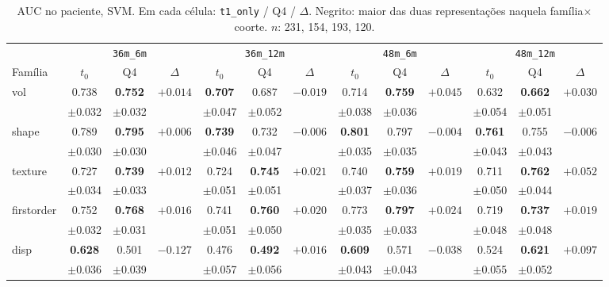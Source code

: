 \documentclass[review]{elsarticle}
\newcommand{\code}[1]{\texttt{#1}}
\begin{document}
\begin{table}
\centering
\footnotesize
\setlength{\tabcolsep}{3.5pt}
\caption{AUC no paciente, SVM.
Em cada célula: \code{t1\_only} / Q4 / $\Delta$.
Negrito: maior das duas representações naquela família$\times$coorte.
$n$: 231, 154, 193, 120.}
\label{tab:uni_4}
\begin{tabular}{@{}l ccc ccc ccc ccc@{}}
\toprule
& \multicolumn{3}{c}{\code{36m\_6m}} & \multicolumn{3}{c}{\code{36m\_12m}} & \multicolumn{3}{c}{\code{48m\_6m}} & \multicolumn{3}{c}{\code{48m\_12m}} \\
\cmidrule(lr){2-4}\cmidrule(lr){5-7}\cmidrule(lr){8-10}\cmidrule(lr){11-13}
Família & $t_0$ & Q4 & $\Delta$ & $t_0$ & Q4 & $\Delta$ & $t_0$ & Q4 & $\Delta$ & $t_0$ & Q4 & $\Delta$ \\
\midrule
vol & 0.738 & \textbf{0.752} & $+0.014$ & \textbf{0.707} & 0.687 & $-0.019$ & 0.714 & \textbf{0.759} & $+0.045$ & 0.632 & \textbf{0.662} & $+0.030$ \\
& $\pm$0.032 & $\pm$0.032 & & $\pm$0.047 & $\pm$0.052 & & $\pm$0.038 & $\pm$0.036 & & $\pm$0.054 & $\pm$0.051 & \\
shape & 0.789 & \textbf{0.795} & $+0.006$ & \textbf{0.739} & 0.732 & $-0.006$ & \textbf{0.801} & 0.797 & $-0.004$ & \textbf{0.761} & 0.755 & $-0.006$ \\
& $\pm$0.030 & $\pm$0.030 & & $\pm$0.046 & $\pm$0.047 & & $\pm$0.035 & $\pm$0.035 & & $\pm$0.043 & $\pm$0.043 & \\
texture & 0.727 & \textbf{0.739} & $+0.012$ & 0.724 & \textbf{0.745} & $+0.021$ & 0.740 & \textbf{0.759} & $+0.019$ & 0.711 & \textbf{0.762} & $+0.052$ \\
& $\pm$0.034 & $\pm$0.033 & & $\pm$0.051 & $\pm$0.051 & & $\pm$0.037 & $\pm$0.036 & & $\pm$0.050 & $\pm$0.044 & \\
firstorder & 0.752 & \textbf{0.768} & $+0.016$ & 0.741 & \textbf{0.760} & $+0.020$ & 0.773 & \textbf{0.797} & $+0.024$ & 0.719 & \textbf{0.737} & $+0.019$ \\
& $\pm$0.032 & $\pm$0.031 & & $\pm$0.051 & $\pm$0.050 & & $\pm$0.035 & $\pm$0.033 & & $\pm$0.048 & $\pm$0.048 & \\
disp & \textbf{0.628} & 0.501 & $-0.127$ & 0.476 & \textbf{0.492} & $+0.016$ & \textbf{0.609} & 0.571 & $-0.038$ & 0.524 & \textbf{0.621} & $+0.097$ \\
& $\pm$0.036 & $\pm$0.039 & & $\pm$0.057 & $\pm$0.056 & & $\pm$0.043 & $\pm$0.043 & & $\pm$0.055 & $\pm$0.052 & \\
\bottomrule
\end{tabular}
\end{table}
\end{document}
